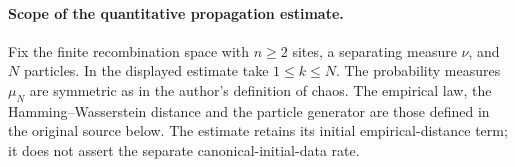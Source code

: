 \paragraph{Scope of the quantitative propagation estimate.}
Fix the finite recombination space with $n\ge2$ sites, a separating measure $\nu$,
and $N$ particles. In the displayed estimate take $1\le k\le N$.
The probability measures $\mu_N$ are symmetric as in the author's definition of chaos.
The empirical law, the Hamming--Wasserstein distance and the particle generator
are those defined in the original source below. The estimate retains its initial
empirical-distance term; it does not assert the separate canonical-initial-data rate.
